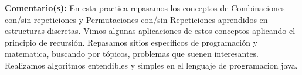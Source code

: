 \noindent\textbf{Comentario(s):} 
En esta practica repasamos los conceptos de Combinaciones con/sin repeticiones y Permutaciones con/sin Repeticiones aprendidos en estructuras discretas. Vimos algunas aplicaciones de estos conceptos aplicando el principio de recursión. Repasamos sitios especificos de programación y matematica, buscando por tópicos, problemas que suenen interesantes. Realizamos algoritmos entendibles y simples en el lenguaje de programacion java. 